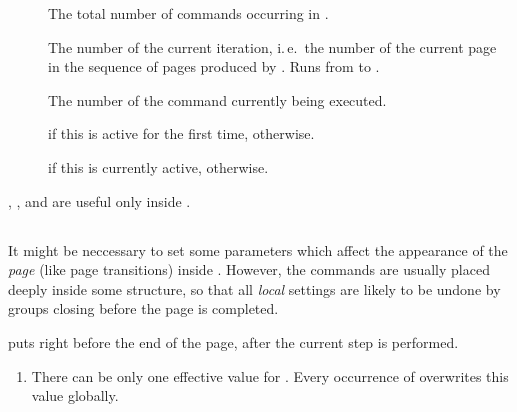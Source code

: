 \begin{slide}
\begin{description}
  \item[]
    The total number of  commands occurring in .

    \newslide

  \item[]
    The number of the current iteration, i.\,e.\ the number of the current page in
    the sequence of pages produced by . Runs from  to
    .

  \item[]
    The number of the  command currently being executed.

  \item[]
     if this  is active for the first time,
     otherwise.

  \item[]
     if this  is currently active, 
    otherwise.
  \end{description}
  , , and  are useful only inside .


  \newslide

  \subsection{}%
  It might be neccessary to set some parameters which affect the appearance of the \emph{page} (like page transitions)
  inside . However, the  commands are usually placed deeply inside some structure, so
  that all \emph{local} settings are likely to be undone by groups closing before the page is completed.

   puts  right before the end of the page, after the
  current step is performed.

  \newslide

  \begin{enumerate}
  \item There can be only one effective value for . Every occurrence of  overwrites
    this value globally.


\end{enumerate}
\end{slide}
